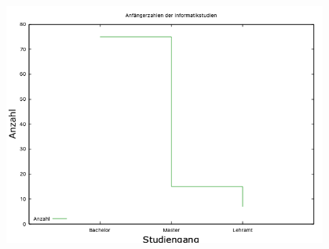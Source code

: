 \documentclass{article}
\begin{document}
    \begin{center}
        \includegraphics[width=0.8\textwidth]{steps}
    \end{center}
\end{document}
